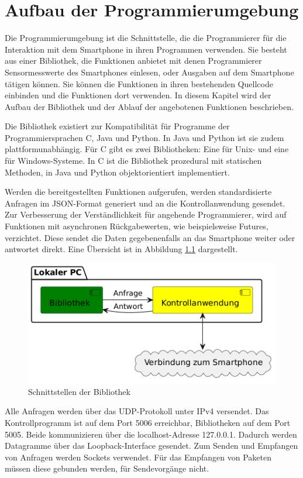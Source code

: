 \documentclass[11pt,a4paper]{report}
\begin{document}
\chapter{Aufbau der Programmierumgebung}\label{chap:libs}
Die Programmierumgebung ist die Schnittstelle, die die Programmierer für die Interaktion mit dem Smartphone in ihren Programmen verwenden.
Sie besteht aus einer Bibliothek, die Funktionen anbietet mit denen Programmierer Sensormesswerte des Smartphones einlesen, oder Ausgaben auf dem Smartphone tätigen können.
Sie können die Funktionen in ihren bestehenden Quellcode einbinden und die Funktionen dort verwenden.
In diesem Kapitel wird der Aufbau der Bibliothek und der Ablauf der angebotenen Funktionen beschrieben. 

Die Bibliothek existiert zur Kompatibilität für Programme der Programmiersprachen C, Java und Python.
In Java und Python ist sie zudem plattformunabhängig.
Für C gibt es zwei Bibliotheken: Eine für Unix- und eine für Windows-Systeme.
In C ist die Bibliothek prozedural mit statischen Methoden, in Java und Python objektorientiert implementiert.

Werden die bereitgestellten Funktionen aufgerufen, werden standardisierte Anfragen im JSON-Format generiert und an die Kontrollanwendung gesendet.
Zur Verbesserung der Verständlichkeit für angehende Programmierer, wird auf Funktionen mit asynchronen Rückgabewerten, wie beispielsweise Futures, verzichtet.
Diese sendet die Daten gegebenenfalls an das Smartphone weiter oder antwortet direkt.
Eine Übersicht ist in Abbildung \ref{fig:Schnittstelle Bibliothek} dargestellt.
\begin{figure}[htbp]
  \centering
  \includegraphics[width=.6\textwidth]{images/lib_server_connection}
  \caption{Schnittstellen der Bibliothek}
  \label{fig:Schnittstelle Bibliothek}
\end{figure}

Alle Anfragen werden über das UDP-Protokoll unter IPv4 versendet.
Das Kontrollprogramm ist auf dem Port 5006 erreichbar, Bibliotheken auf dem Port 5005.
Beide kommunizieren über die localhost-Adresse 127.0.0.1.
Dadurch werden Datagramme über das Loopback-Interface gesendet.
Zum Senden und Empfangen von Anfragen werden Sockets verwendet.
Für das Empfangen von Paketen müssen diese gebunden werden, für Sendevorgänge nicht.
\end{document}
